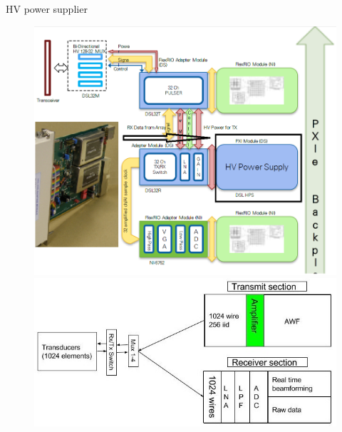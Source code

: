\documentclass[t,12pt,english
\ifx\beamermode\undefined\else,\beamermode\fi
]{beamer}
\begin{document}
\begin{frame}{HV power supplier}

\begin{figure}[!htb]
\includegraphics[width=.95\textwidth]{2_6.png}
\endminipage
{}
\includegraphics[width=1\textwidth,left]{45.jpg}
\endminipage
\end{figure}

\end{frame}
\end{document}
